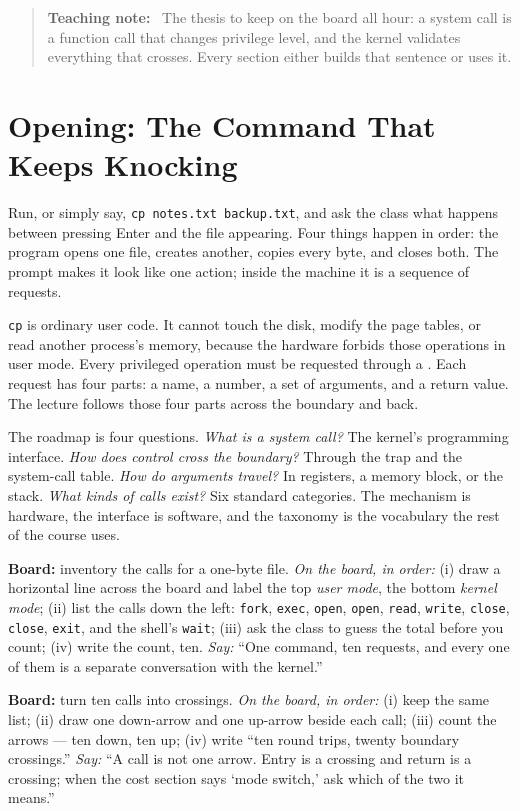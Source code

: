 \documentclass[11pt]{article}
\newenvironment{teachingaside}{\begin{quote}\small\color{primary-gold}\textbf{Teaching note:}\ }{\end{quote}}
\begin{document}
\begin{teachingaside}
The thesis to keep on the board all hour: a system call is a function call that changes privilege level, and the kernel validates everything that crosses. Every section either builds that sentence or uses it.
\end{teachingaside}

\section{Opening: The Command That Keeps Knocking}

Run, or simply say, \texttt{cp notes.txt backup.txt}, and ask the class what happens between pressing Enter and the file appearing. Four things happen in order: the program opens one file, creates another, copies every byte, and closes both. The prompt makes it look like one action; inside the machine it is a sequence of requests.

\texttt{cp} is ordinary user code. It cannot touch the disk, modify the page tables, or read another process's memory, because the hardware forbids those operations in user mode. Every privileged operation must be requested through a . Each request has four parts: a name, a number, a set of arguments, and a return value. The lecture follows those four parts across the boundary and back.

The roadmap is four questions. \emph{What is a system call?} The kernel's programming interface. \emph{How does control cross the boundary?} Through the trap and the system-call table. \emph{How do arguments travel?} In registers, a memory block, or the stack. \emph{What kinds of calls exist?} Six standard categories. The mechanism is hardware, the interface is software, and the taxonomy is the vocabulary the rest of the course uses.

\textbf{Board:} inventory the calls for a one-byte file. \emph{On the board, in order:} (i) draw a horizontal line across the board and label the top \emph{user mode}, the bottom \emph{kernel mode}; (ii) list the calls down the left: \texttt{fork}, \texttt{exec}, \texttt{open}, \texttt{open}, \texttt{read}, \texttt{write}, \texttt{close}, \texttt{close}, \texttt{exit}, and the shell's \texttt{wait}; (iii) ask the class to guess the total before you count; (iv) write the count, ten. \emph{Say:} ``One command, ten requests, and every one of them is a separate conversation with the kernel.''

\textbf{Board:} turn ten calls into crossings. \emph{On the board, in order:} (i) keep the same list; (ii) draw one down-arrow and one up-arrow beside each call; (iii) count the arrows --- ten down, ten up; (iv) write ``ten round trips, twenty boundary crossings.'' \emph{Say:} ``A call is not one arrow. Entry is a crossing and return is a crossing; when the cost section says `mode switch,' ask which of the two it means.''
\end{document}
